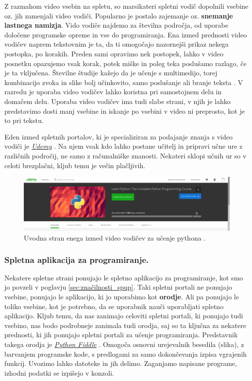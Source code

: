 Z razmahom video vsebin na spletu, so marsikateri spletni vodič
dopolnili vsebine oz. jih zamenjali video vodiči. Popularno je postalo
zajemanje oz. \textbf{snemanje lastnega namizja}. Vido vodiče najdemo
za številna področja, od uporabe določene programske opreme in vse do
programiranja. Ena izmed prednosti video vodičev naprem tekstovnim je
ta, da ti omogočajo nazornejši prikaz nekega postopka, po
korakih. Preden sami opravimo nek postopek, lahko v video posnetku
opazujemo vsak korak, potek miške in poleg teka poslušamo razlago, če
je ta vključena.  Številne študije kažejo da je učenje s multimedijo,
torej kombinacijo zvoka in slike bolj učinkovito, samo poslušanje ali
branje teksta \cite{web:multimediaL}. V razredu je uporaba video
vodičev lahko koristna pri samostojnem delu in domačem delu. Uporaba
video vodičev ima tudi slabe strani, v njih je lahko predstavimo dosti
manj vsebine in iskanje po vsebini v video ni preprosto, kot je to pri
tekstu.

Eden izmed spletnih portalov, ki je specializiran za podajanje znanja
s video vodiči je \emph{\href{https://www.udemy.com}{Udemy}}
\cite{web:udemy}. Na njem vsak kdo lahko postane učitelj in pripravi
učne ure z različnih področij, ne samo z računalniške
znanosti. Nekateri sklopi učnih ur so v celoti brezplačni, kljub temu
je večin plačljivih.

\begin{figure}[h!]
    \includegraphics [width=1\linewidth, keepaspectratio =
    1] {./images/sc_web/udemy_01.jpg}
    \caption{Uvodna stran enega izmed video vodičev za učenje pythona
      \cite{web:udemy}.}
    \label{fig:scr:web:udemy}
\end{figure}

\subsubsection{Spletna aplikacija za programiranje.}
\label{sec:spletna_app_programiranje}

Nekatere spletne strani ponujajo le spletno aplikacijo za
programiranje, kot smo jo povzeli v poglavju
\ref{sec:značilnosti_spup}. Taki spletni portali ne ponujajo vsebine,
ponujajo le aplikacijo, ki jo uporabimo kot \textbf{orodje}. Ali pa
ponujajo le toliko vsebine, kot je potrebno, da se uporabnik nauči
uporabljati spletno aplikacijo. Kljub temu, da nas zanimajo celoviti
spletni portali, ki ponujajo tudi vsebino, nas bodo podrobneje
zanimala tudi orodja, saj so ta ključna za nekatere prednosti, ki jih
ponujajo spletni portali za učenje programiranja. Predstavnik takega
orodja je \emph{\href{http://pythonfiddle.com/}{Python Fiddle}}
\cite{web:pythonfiddle}. Omogoča osnovni urejevalnik besedila (slika),
z barvanjem programske kode, s predlogami za samo dokončevanja izpisa
vgrajenih funkcij. Uvozimo lahko datoteke in jih delimo. Zaganjamo
napisane programe, izhodni podatki se izpišejo v konzoli.

